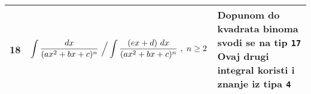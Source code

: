 \documentclass{article}
\begin{document}
\begin{tabular}{|I{0.5cm}|p{7.5cm}|R{10cm}|}
		\hline
		   \vspace{2mm} 18  & \[ \int{\frac{dx}{(ax^2+bx+c)^n} }\ \Big/\int{\frac{(ex+d)\ dx}{(ax^2+bx+c)^n}} \ , \hspace{1mm} n \geq 2 \]  & Dopunom do kvadrata binoma svodi se na tip \texttt{17} \newline Ovaj drugi integral koristi i znanje iz tipa \texttt{4} \\
		\hline

      \end{tabular}
\end{document}

